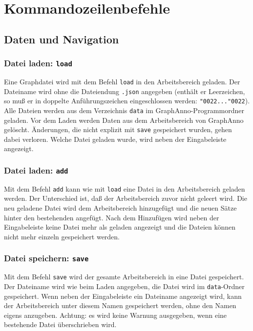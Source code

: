 \documentclass[12pt]{scrartcl}
\newcommand{\quo}{\char"0022}
\begin{document}
\section{Kommandozeilenbefehle}

\subsection{Daten und Navigation}

\subsubsection{Datei laden: \texttt{load}}

Eine Graphdatei wird mit dem Befehl \texttt{load} in den Arbeitsbereich geladen. Der Dateiname wird ohne die Dateiendung \texttt{.json} angegeben (enthält er Leerzeichen, so muß er in doppelte Anführungszeichen eingeschlossen werden: \texttt{\quo...\quo}). Alle Dateien werden aus dem Verzeichnis \texttt{data} im GraphAnno-Programmordner geladen. Vor dem Laden werden Daten aus dem Arbeitsbereich von GraphAnno gelöscht. Änderungen, die nicht explizit mit \texttt{save} gespeichert wurden, gehen dabei verloren.
Welche Datei geladen wurde, wird neben der Eingabeleiste angezeigt.


\subsubsection{Datei laden: \texttt{add}}

Mit dem Befehl \texttt{add} kann wie mit \texttt{load} eine Datei in den Arbeitsbereich geladen werden. Der Unterschied ist, daß der Arbeitsbereich zuvor nicht geleert wird. Die neu geladene Datei wird dem Arbeitsbereich hinzugefügt und die neuen Sätze hinter den bestehenden angefügt. Nach dem Hinzufügen wird neben der Eingabeleiste keine Datei mehr als geladen angezeigt und die Dateien können nicht mehr einzeln gespeichert werden.


\subsubsection{Datei speichern: \texttt{save}}

Mit dem Befehl \texttt{save} wird der gesamte Arbeitsbereich in eine Datei gespeichert. Der Dateiname wird wie beim Laden angegeben, die Datei wird im \texttt{data}-Ordner gespeichert. Wenn neben der Eingabeleiste ein Dateiname angezeigt wird, kann der Arbeitsbereich unter diesem Namen gespeichert werden, ohne den Namen eigens anzugeben.
Achtung: es wird keine Warnung ausgegeben, wenn eine bestehende Datei überschrieben wird.
\end{document}
